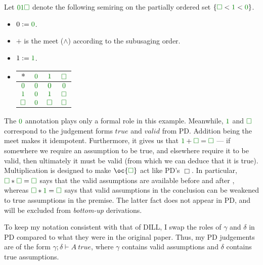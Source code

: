 \begin{definition}
  Let $\instPD$ denote the following semiring on the partially ordered set
  $\{\valid < \true < \unused\}$.
  \begin{itemize}
    \item $0 := \unused$.
    \item $+$ is the meet ($\wedge$) according to the subusaging order.
    \item $1 := \true$.
    \item
      \begin{tabular}{c|ccc}
        $*$ & $\unused$ & $\true$ & $\valid$ \\ \hline
        $\unused$ & $\unused$ & $\unused$ & $\unused$ \\
        $\true$ & $\unused$ & $\true$ & $\valid$ \\
        $\valid$ & $\unused$ & $\valid$ & $\valid$ \\
      \end{tabular}
  \end{itemize}
\end{definition}

The $\unused$ annotation plays only a formal role in this example.
Meanwhile, $\true$ and $\valid$ correspond to the judgement forms
$\mathit{true}$ and $\mathit{valid}$ from PD\@.
Addition being the meet makes it idempotent.
Furthermore, it gives us that $\true + \valid = \valid$ --- if somewhere we
require an assumption to be true, and elsewhere require it to be valid, then
ultimately it must be valid (from which we can deduce that it is true).
Multiplication is designed to make $\oc{\valid}$ act like PD's $\Box$.
In particular, $\valid * \valid = \valid$ says that the valid assumptions are
available before and after , whereas
$\valid * \true = \valid$ says that valid assumptions in the conclusion can be
weakened to true assumptions in the premise.
The latter fact does not appear in PD, and will be excluded from
\emph{bottom-up} derivations.

To keep my notation consistent with that of DILL, I swap the roles of
$\gamma$ and $\delta$ in PD compared to what they were in the original paper.
Thus, my PD judgements are of the form $\gamma; \delta \vdash A~\mathit{true}$,
where $\gamma$ contains valid assumptions and $\delta$ contains true
assumptions.

